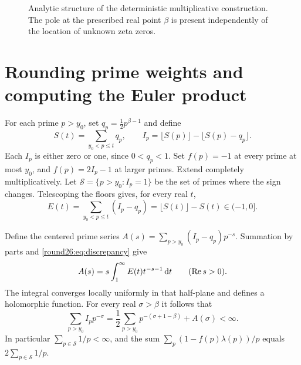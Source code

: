 \begin{figure}[tb]
\centering
{}
\caption{Analytic structure of the deterministic multiplicative construction. The pole at the prescribed real point $\beta$ is present independently of the location of unknown zeta zeros.}
\label{round26:fig:rh-pole}
\end{figure}

\section{Rounding prime weights and computing the Euler product}

For each prime $p>y_0$, set $q_p=\tfrac12p^{\beta-1}$ and define
\[
 S(t)=\sum_{y_0<p\le t}q_p,
 \qquad I_p=\lfloor S(p)\rfloor-\lfloor S(p)-q_p\rfloor.
\]
Each $I_p$ is either zero or one, since $0<q_p<1$. Set $f(p)=-1$
at every prime at most $y_0$, and $f(p)=2I_p-1$ at larger primes.
Extend completely multiplicatively. Let $\mathcal S=\{p>y_0:I_p=1\}$
be the set of primes where the sign changes. Telescoping the floors
gives, for every real $t$,
\begin{equation}\label{round26:eq:discrepancy}
 E(t)=\sum_{y_0<p\le t}(I_p-q_p)=\lfloor S(t)\rfloor-S(t)\in(-1,0].
\end{equation}

Define the centered prime series $A(s)=\sum_{p>y_0}(I_p-q_p)p^{-s}$.
Summation by parts and \eqref{round26:eq:discrepancy} give
\begin{equation}\label{round26:eq:centered}
 A(s)=s\int_1^\infty E(t)t^{-s-1}\,\mathrm d t\qquad(\operatorname{Re} s>0).
\end{equation}
The integral converges locally uniformly in that half-plane and defines
a holomorphic function. For every real $\sigma>\beta$ it follows that
\begin{equation}\label{round26:eq:thin}
 \sum_{p>y_0}I_pp^{-\sigma}
   =\frac12\sum_{p>y_0}p^{-(\sigma+1-\beta)}+A(\sigma)<\infty.
\end{equation}
In particular $\sum_{p\in\mathcal S}1/p<\infty$, and the sum
$\sum_p(1-f(p)\lambda(p))/p$ equals $2\sum_{p\in\mathcal S}1/p$.

